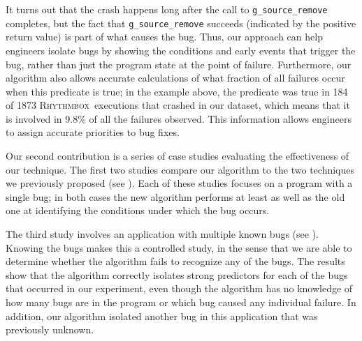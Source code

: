 \documentclass[10pt]{acmconfbig}
\newcommand{\rhythmbox}{\textsc{Rhythmbox}\xspace}
\begin{document}
It turns out that the crash happens long after the call to {\tt g\_source\_remove} completes,
but the fact that {\tt g\_source\_remove} succeeds (indicated by the positive return value) is part of what causes the bug.  Thus,
our approach can help engineers isolate bugs by showing the conditions and early events that trigger the bug, rather than just the
program state at the point of failure.  Furthermore, our algorithm also allows accurate calculations of what fraction of all failures occur when this predicate
is true; in the example above, the predicate was true in 184 of 1873 \rhythmbox\ executions that crashed in our dataset, which means that
it is involved in 9.8\% of all the failures observed.  This information allows engineers to assign accurate priorities to bug fixes.


Our second contribution is a series of case studies evaluating the effectiveness of
our technique.  The first two studies compare our algorithm to the two techniques
we previously proposed (see ).  Each of these studies focuses on a
program with a single bug; in both cases the new algorithm
performs at least as well as the old one at identifying the conditions under which the bug occurs.  

The third study involves an application with multiple known bugs (see
).  Knowing the bugs makes this a controlled study, 
in the sense that we are able to determine whether the algorithm fails to recognize any of the
bugs.  The results show that the algorithm correctly
isolates strong predictors for each of the bugs that occurred in our
experiment, even though the algorithm has no knowledge of how many
bugs are in the program or which bug caused any individual failure.
In addition, our algorithm isolated another bug in this application that was previously unknown.
\end{document}
